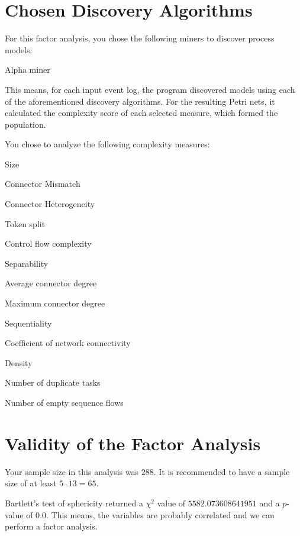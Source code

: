 \documentclass[a4paper]{article}
\begin{document}
\section*{Chosen Discovery Algorithms}
For this factor analysis, you chose the following miners to discover process models:
\begin{compactitem}
\item Alpha miner
\end{compactitem}

This means, for each input event log, the program discovered models using each of the aforementioned discovery algorithms.
For the resulting Petri nets, it calculated the complexity score of each selected measure, which formed the population.

You chose to analyze the following complexity measures:
\begin{compactitem}
\item Size
\item Connector Mismatch
\item Connector Heterogeneity
\item Token split
\item Control flow complexity
\item Separability
\item Average connector degree
\item Maximum connector degree
\item Sequentiality
\item Coefficient of network connectivity
\item Density
\item Number of duplicate tasks
\item Number of empty sequence flows
\end{compactitem}

\section*{Validity of the Factor Analysis}
Your sample size in this analysis was $288$.
It is recommended to have a sample size of at least $5 \cdot 13 = 65$.

Bartlett's test of sphericity returned a $\chi^2$ value of $5582.073608641951$ and a $p$-value of $0.0$.
This means, the variables are probably correlated and we can perform a factor analysis.
\end{document}
